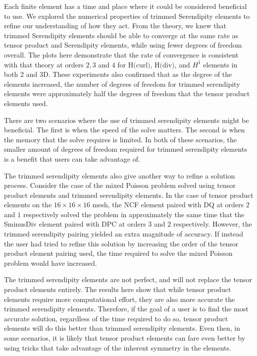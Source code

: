 \documentclass[manuscript,screen]{acmart}
\begin{document}
Each finite element has a time and place where it could be considered beneficial to use.  We explored the numerical properties of trimmed Serendipity elements to refine our understanding of how they act.  From the theory, we knew that trimmed Serendipity elements should be able to converge at the same rate as tensor product and Serendipity elements, while using fewer degrees of freedom overall.  The plots here demonstrate that the rate of convergence is consistent with that theory at orders $2, 3$ and $4$ for H$($curl$)$, H$($div$)$, and $H^1$ elements in both 2 and 3D.  These experiments also confirmed that as the degree of the elements increased, the number of degrees of freedom for trimmed serendipity elements were approximately half the degrees of freedom that the tensor product elements used.

There are two scenarios where the use of trimmed serendipity elements might be beneficial.  The first is when the speed of the solve matters.  The second is when the memory that the solve requires is limited.  In both of these scenarios, the smaller amount of degrees of freedom required for trimmed serendipity elements is a benefit that users can take advantage of.  

The trimmed serendipity elements also give another way to refine a solution process.  Consider the case of the mixed Poisson problem solved using tensor product elements and trimmed serendipity elements.  In the case of tensor product elements on the $16 \times 16 \times 16$ mesh, the NCF element paired with DQ at orders $2$ and $1$ respectively solved the problem in approximately the same time that the SminusDiv element paired with DPC at orders $3$ and $2$ respectively.  However, the trimmed serendipity pairing yielded an extra magnitude of accuracy.  If instead the user had tried to refine this solution by increasing the order of the tensor product element pairing used, the time required to solve the mixed Poisson problem would have increased.

The trimmed serendipity elements are not perfect, and will not replace the tensor product elements entirely.  The results here show that while tensor product elements require more computational effort, they are also more accurate the trimmed serendipity elements.  Therefore, if the goal of a user is to find the most accurate solution, regardless of the time required to do so, tensor product elements will do this better than trimmed serendipity elements.  Even then, in some scenarios, it is likely that tensor product elements can fare even better by using tricks that take advantage of the inherent symmetry in the elements.  
\end{document}
